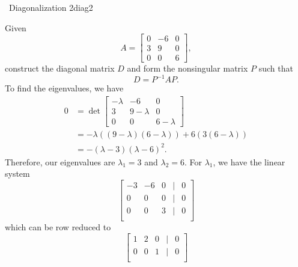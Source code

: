         \begin{example}{\Difficulty\,\Difficulty\,\,Diagonalization 2}{diag2}

            Given
            \begin{equation*}
                A=\begin{bmatrix}
                    0 & -6 & 0 \\
                    3 & 9 & 0 \\
                    0 & 0 & 6
                \end{bmatrix},
            \end{equation*}
            construct the diagonal matrix \(D\) and form the nonsingular matrix \(P\) such that
            \begin{equation*}
                D=P^{-1}AP.
            \end{equation*}
            To find the eigenvalues, we have
            \begin{align*}
                0&=\det\begin{bmatrix}
                    -\lambda & -6 & 0 \\
                    3 & 9-\lambda & 0 \\
                    0 & 0 & 6-\lambda
                \end{bmatrix} \\
                &=-\lambda((9-\lambda)(6-\lambda))+6(3(6-\lambda)) \\
                &=-(\lambda-3)(\lambda-6)^2.
            \end{align*}
            Therefore, our eigenvalues are \(\lambda_1=3\) and \(\lambda_2=6\). For \(\lambda_1\), we have the linear system
            \begin{equation*}
                \begin{bmatrix}
                    -3 & -6 & 0 & | & 0 \\
                    0 & 0 & 0 & | & 0 \\
                    0 & 0 & 3 & | & 0 \\
                \end{bmatrix}
            \end{equation*}
            which can be row reduced to
            \begin{equation*}
                \begin{bmatrix}
                    1 & 2 & 0 & | & 0 \\
                    0 & 0 & 1 & | & 0 \\

\end{bmatrix}
\end{equation*}
\end{example}
